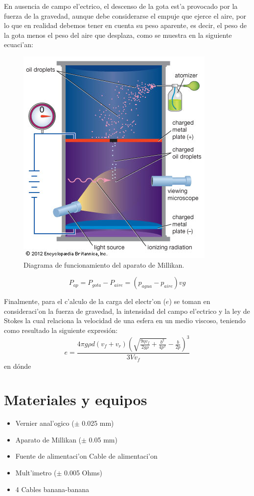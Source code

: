 \documentclass{article}
\begin{document}
\begin{multicols}{2}
En ausencia de campo el'ectrico, el descenso de la gota est'a provocado por la fuerza de la gravedad, aunque debe considerarse el empuje que ejerce el aire, por lo que en realidad debemos tener en cuenta su peso aparente, es decir, el peso de la gota menos el peso del aire que desplaza, como se muestra en la siguiente ecuaci'an:

\begin{figure}[H]
	\centering
	\includegraphics[scale = 0.6]{EM1.jpg}
	\caption{Diagrama de funcionamiento del aparato de Millikan.}
	\label{Fig:a}
\end{figure}
\begin{equation}\label{Ec:1}
	    P_{ap}=P_{gota}-P_{aire}=(p_{agua}-p_{aire})vg
\end{equation}

Finalmente, para el c'alculo de la carga del electr'on ($e$) se toman en consideraci'on la fuerza de gravedad, la intensidad del campo el'ectrico y la ley de Stokes la cual relaciona la velocidad de una esfera en un medio viscoso, teniendo como resultado la siguiente expresión: 
\begin{equation}
   e= \frac{4\pi g\rho d\left(v_{f}+v_{r}\right)\left(\sqrt{\frac{9\eta v_{f}}{2g\rho}+\frac{b^{2}}{4p^{2}}}-\frac{b}{2p}\right)^{3}}{3Vv_{f}}
\end{equation}
en dónde 

\section*{Materiales y equipos}\label{Material}                          	%
\begin{itemize}
	\item Vernier anal'ogico ($\pm$ 0.025 mm)
	\item Aparato de Millikan ($\pm$ 0.05 mm)
	\item Fuente de alimentaci'on
		\subitem Cable de alimentaci'on 
	\item Mult'imetro ($\pm$ 0.005 Ohms)
	\item 4 Cables banana-banana
\end{itemize}


\end{multicols}
\end{document}
